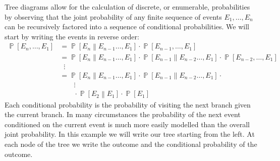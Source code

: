 \documentclass[answers]{exam}
\begin{document}
\begin{questions}
\begin{solution}
            Tree diagrams allow for the calculation of discrete, or enumerable,
            probabilities by observing that the joint probability of any finite sequence of
            events $E_1, \dots, E_n$ can be recursively factored into a sequence of
            conditional probabilities. We will start by writing the events in reverse order:
            \begin{align*}
                \operatorname{\mathbb{P}}\left[ E_n, \dots, E_1 \right]
                & =
                \operatorname{\mathbb{P}}\left[ E_n \middle\| E_{n-1} \dots, E_1 \right]
                \cdot
                \operatorname{\mathbb{P}}\left[ E_{n-1}, \dots, E_1 \right]
                \\ & =
                \operatorname{\mathbb{P}}\left[ E_n \middle\| E_{n-1} \dots, E_1 \right]
                \cdot
                \operatorname{\mathbb{P}}\left[ E_{n-1} \middle\| E_{n-2} \dots, E_1 \right]
                \cdot
                \operatorname{\mathbb{P}}\left[ E_{n-2}, \dots, E_1 \right]
                \\ & \; \; \vdots
                \\ & =
                \operatorname{\mathbb{P}}\left[ E_n \middle\| E_{n-1} \dots, E_1 \right]
                \cdot
                \operatorname{\mathbb{P}}\left[ E_{n-1} \middle\| E_{n-2} \dots, E_1 \right]
                \cdot
                \\ & \qquad \vdots
                \\ & \qquad \cdot
                \operatorname{\mathbb{P}}\left[ E_2 \middle\| E_1 \right]
                \cdot
                \operatorname{\mathbb{P}}\left[ E_1 \right]
            \end{align*}
            Each conditional probability is the probability of visiting the next branch
            given the current branch. In many circumstances the probability of the next
            event conditioned on the current event is much more easily modelled than the
            overall joint probability. In this example we will write our tree starting from
            the left. At each node of the tree we write the outcome and the conditional
            probability of the outcome.
            

\end{solution}
\end{questions}
\end{document}
